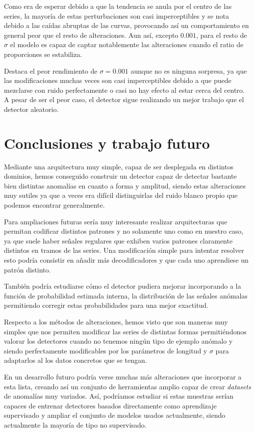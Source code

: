 Como era de esperar debido a que la tendencia se anula por el centro de las series, la mayoría de estas perturbaciones son casi imperceptibles y se nota debido a las caídas abruptas de las curvas, provocando así un comportamiento en general peor que el resto de alteraciones. Aun así, excepto $0.001$, para el resto de $\sigma$ el modelo es capaz de captar notablemente las alteraciones cuando el ratio de proporciones se estabiliza.

Destaca el peor rendimiento de $\sigma = 0.001$ aunque no es ninguna sorpresa, ya que las modificaciones muchas veces son casi imperceptibles debido a que puede mezclarse con ruido perfectamente o casi no hay efecto al estar cerca del centro. A pesar de ser el peor caso, el detector sigue realizando un mejor trabajo que el detector aleatorio.

\chapter{Conclusiones y trabajo futuro}\label{ch:ad-conclusiones}

Mediante una arquitectura muy simple, capaz de ser desplegada en distintos dominios, hemos conseguido construir un detector capaz de detectar bastante bien distintas anomalías en cuanto a forma y amplitud, siendo estas alteraciones muy sutiles ya que a veces era difícil distinguirlas del ruido blanco propio que podemos encontrar generalmente.

Para ampliaciones futuras sería muy interesante realizar arquitecturas que permitan codificar distintos patrones y no solamente uno como en nuestro caso, ya que suele haber señales regulares que exhiben varios patrones claramente distintos en tramos de las series. Una modificación simple para intentar resolver esto podría consistir en añadir más decodificadores y que cada uno aprendiese un patrón distinto.

También podría estudiarse cómo el detector pudiera mejorar incorporando a la función de probabilidad estimada interna, la distribución de las señales anómalas permitiendo corregir estas probabilidades para una mejor exactitud.

Respecto a los métodos de alteraciones, hemos visto que son maneras muy simples que nos permiten modificar las series de distintas formas permitiéndonos valorar los detectores cuando no tenemos ningún tipo de ejemplo anómalo y siendo perfectamente modificables por los parámetros de longitud y $\sigma$ para adaptarlos al los datos concretos que se tengan.

En un desarrollo futuro podría verse muchas más alteraciones que incorporar a esta lista, creando así un conjunto de herramientas amplio capaz de crear \emph{datasets} de anomalías muy variados. Así, podríamos estudiar si estas muestras serían capaces de entrenar detectores basados directamente como aprendizaje supervisado y ampliar el conjunto de modelos usados actualmente, siendo actualmente la mayoría de tipo no supervisado.

\endinput
